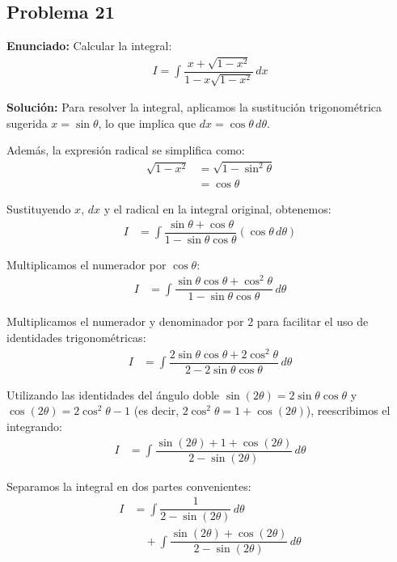 \subsection*{Problema 21}
\textbf{Enunciado:} Calcular la integral:
\begin{align*}
    I = \int \dfrac{x + \sqrt{1 - x^2}}{1 - x \sqrt{1 - x^2}} \, dx
\end{align*}

\textbf{Solución:} 
Para resolver la integral, aplicamos la sustitución trigonométrica sugerida $x = \sin\theta$, lo que implica que $dx = \cos\theta \, d\theta$. 

Además, la expresión radical se simplifica como:
\begin{align*}
    \sqrt{1 - x^2} &= \sqrt{1 - \sin^2\theta} \\
    &= \cos\theta
\end{align*}

Sustituyendo $x$, $dx$ y el radical en la integral original, obtenemos:
\begin{align*}
    I &= \int \dfrac{\sin\theta + \cos\theta}{1 - \sin\theta \cos\theta} (\cos\theta \, d\theta)
\end{align*}

Multiplicamos el numerador por $\cos\theta$:
\begin{align*}
    I &= \int \dfrac{\sin\theta\cos\theta + \cos^2\theta}{1 - \sin\theta \cos\theta} \, d\theta
\end{align*}

Multiplicamos el numerador y denominador por $2$ para facilitar el uso de identidades trigonométricas:
\begin{align*}
    I &= \int \dfrac{2\sin\theta\cos\theta + 2\cos^2\theta}{2 - 2\sin\theta \cos\theta} \, d\theta
\end{align*}

Utilizando las identidades del ángulo doble $\sin(2\theta) = 2\sin\theta\cos\theta$ y $\cos(2\theta) = 2\cos^2\theta - 1$ (es decir, $2\cos^2\theta = 1 + \cos(2\theta)$), reescribimos el integrando:
\begin{align*}
    I &= \int \dfrac{\sin(2\theta) + 1 + \cos(2\theta)}{2 - \sin(2\theta)} \, d\theta
\end{align*}

Separamos la integral en dos partes convenientes:
\begin{align*}
    I &= \int \dfrac{1}{2 - \sin(2\theta)} \, d\theta \\
    &\quad + \int \dfrac{\sin(2\theta) + \cos(2\theta)}{2 - \sin(2\theta)} \, d\theta
\end{align*}

